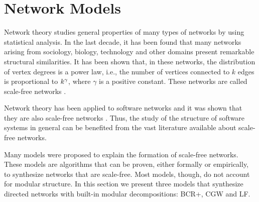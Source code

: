 

%

\section{Network Models} \label{sec:models} 

Network theory studies general properties of many types of networks by using
statistical analysis. In the last decade, it has been found that many networks
arising from sociology, biology, technology and other domains present remarkable
structural similarities. It has been shown that, in these networks, the
distribution of vertex degrees is a power law, i.e., the number of vertices
connected to $k$ edges is proportional to $k^{\-\gamma}$, where $\gamma$ is a
positive constant. These networks are called scale-free networks
\cite{Barabasi1999}.

Network theory has been applied to software networks and it was shown that they
are also scale-free networks \cite{Myers2003,Valverde2002}. Thus, the study of
the structure of software systems in general can be benefited from the vast
literature available about scale-free networks.

Many models were proposed to explain the formation of scale-free networks. These
models are algorithms that can be proven, either formally or empirically, to
synthesize networks that are scale-free. Most models, though, do not account for
modular structure. In this section we present three models that synthesize
directed networks with built-in modular decompositions: BCR+, CGW and LF. 




